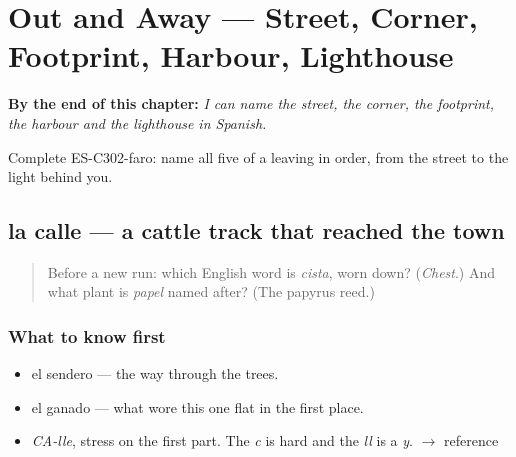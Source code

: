 
\chapter{Out and Away --- Street, Corner, Footprint, Harbour, Lighthouse}
\label{ch:calle-y-faro}

\begin{chapteropening}
\textbf{By the end of this chapter:} \emph{I can name the street, the corner, the footprint, the harbour and the lighthouse in Spanish.}

Complete ES-C302-faro: name all five of a leaving in order, from the street to the light behind you.
\end{chapteropening}

\section[la calle]{la calle — a cattle track that reached the town}

\label{lesson:ES-C302-calle}



\begin{quote}
Before a new run: which English word is \emph{cista}, worn down? (\emph{Chest}.) And what plant is \emph{papel} named after? (The papyrus reed.)
\end{quote}

\subsection*{What to know first}
\begin{itemize}
\raggedright
  \item el sendero — the way through the trees.
  \item el ganado — what wore this one flat in the first place.
\end{itemize}

\begin{sounds}
\begin{itemize}
\raggedright
  \item \emph{CA-lle}, stress on the first part. The \emph{c} is hard and the \emph{ll} is a \emph{y}. $\to$ reference
\end{itemize}
\end{sounds}

